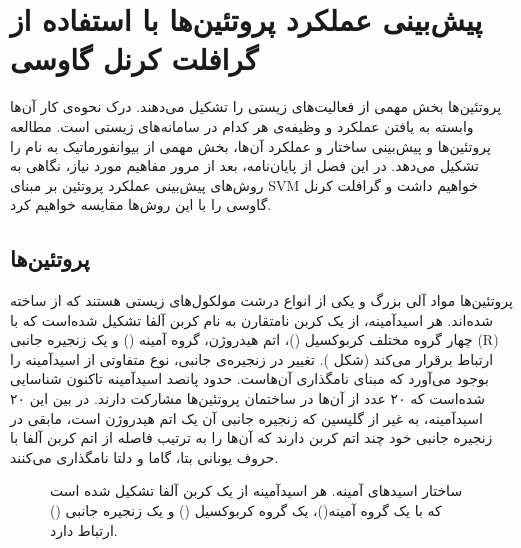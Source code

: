 \chapter{پیش‌بینی عملکرد پروتئین‌ها با استفاده از گرافلت کرنل گاوسی}\label{chap:protein_function_prediction}

پروتئین‌ها بخش مهمی از فعالیت‌های زیستی را تشکیل می‌دهند. درک نحوه‌ی کار آن‌ها وابسته به یافتن عملکرد و وظیفه‌ی هر کدام در سامانه‌های زیستی است. مطالعه پروتئین‌ها و پیش‌بینی ساختار و عملکرد آن‌ها، بخش مهمی از بیوانفورماتیک به نام  را تشکیل می‌دهد. در این فصل از پایان‌نامه، بعد از مرور مفاهیم مورد نیاز، نگاهی به روش‌های پیش‌بینی عملکرد پروتئین بر مبنای SVM خواهیم داشت و گرافلت کرنل گاوسی را با این روش‌ها مقایسه خواهیم کرد.

\section{پروتئین‌ها}\label{sec:protein-structure}
پروتئین‌ها مواد آلی بزرگ و یکی از انواع درشت مولکول‌های زیستی هستند که از  ساخته شده‌اند. هر اسیدآمینه، از یک کربن نامتقارن به نام کربن آلفا تشکیل شده‌است که با چهار گروه مختلف کربوکسیل ()، اتم هیدروژن، گروه آمینه () و یک زنجیره جانبی (R) ارتباط برقرار می‌کند (شکل ). تغییر در زنجیره‌ی جانبی، نوع متفاوتی از اسیدآمینه را بوجود می‌آورد که مبنای نامگذاری آن‌هاست. حدود پانصد اسیدآمینه تاکنون شناسایی شده‌است که ۲۰ عدد از آن‌ها در ساختمان پروتئین‌ها مشارکت دارند. در بین این ۲۰ اسیدآمینه، به غیر از گلیسین که زنجیره جانبی آن یک اتم هیدروژن است، مابقی در زنجیره جانبی خود چند اتم کربن دارند که آن‌ها را به ترتیب فاصله از اتم کربن آلفا با حروف یونانی بتا، گاما و دلتا نامگذاری می‌کنند.

\begin{figure}[h]
\caption{
ساختار اسید‌های آمینه. هر اسیدآمینه از یک کربن آلفا تشکیل شده است که با یک گروه آمینه()، یک گروه کربوکسیل () و یک زنجیره جانبی () ارتباط دارد.
}
\label{fig:aminoacid}
\end{figure}

